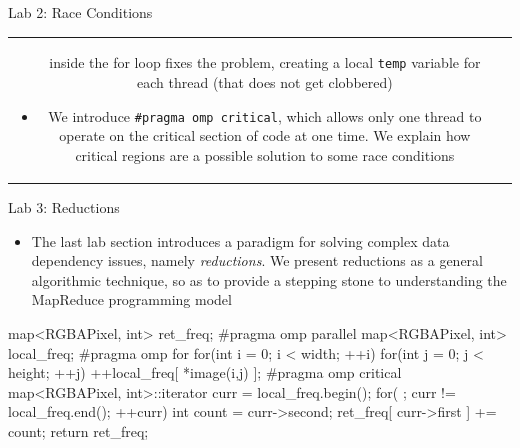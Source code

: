 \documentclass[final,t]{beamer}
\begin{document}
\begin{frame}[fragile]{}
\begin{columns}[t]
\begin{column}{.3\linewidth}
\begin{block}{Lab 2: Race Conditions}
\begin{tabular}{cc}
\begin{minipage}[b]{.5\textwidth}
\begin{itemize}
                            inside the for loop fixes the problem, creating a
                            local \verb|temp| variable for each thread (that
                            does not get clobbered)
                        \item We introduce \verb|#pragma omp critical|, which
                        allows only one thread to operate on the critical
                        section of code at one time. We explain how critical
                        regions are a possible solution to some race conditions 
                    \end{itemize}
                \end{minipage} \\
            \end{tabular}
            \end{block}
            \begin{block}{Lab 3: Reductions}
                \begin{itemize}
                    \item The last lab section introduces a paradigm for
                        solving complex data dependency issues, namely {\em
                        reductions}.  We present reductions as a general
                        algorithmic technique, so as to  provide a stepping
                        stone to understanding the MapReduce programming
                        model
                \end{itemize}
                \begin{cppcode}
map<RGBAPixel, int> ret_freq;
#pragma omp parallel
{
   map<RGBAPixel, int> local_freq;
#pragma omp for
   for(int i = 0; i < width; ++i) {
      for(int j = 0; j < height; ++j)
          ++local_freq[ *image(i,j) ];
   }
#pragma omp critical
   {
       map<RGBAPixel, int>::iterator curr = local_freq.begin();
      for( ; curr != local_freq.end(); ++curr) {
         int count = curr->second;
         ret_freq[ curr->first ] += count;
      }
   }
}
return ret_freq;
                \end{cppcode}
                \begin{tabular}{cc}

\end{tabular}
\end{block}
\end{column}
\end{columns}
\end{frame}
\end{document}
